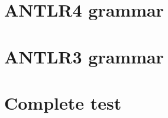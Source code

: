 \documentclass[a4paper]{report}
\begin{document}
\begin{appendices}
\begin{landscape}
\chapter{ANTLR4 grammar}
\label{app:antlr4}


\chapter{ANTLR3 grammar}
\label{app:antlr3}
\end{landscape}
\lstset{mathescape=false}

\chapter{Complete test}


\end{appendices}
\end{document}
